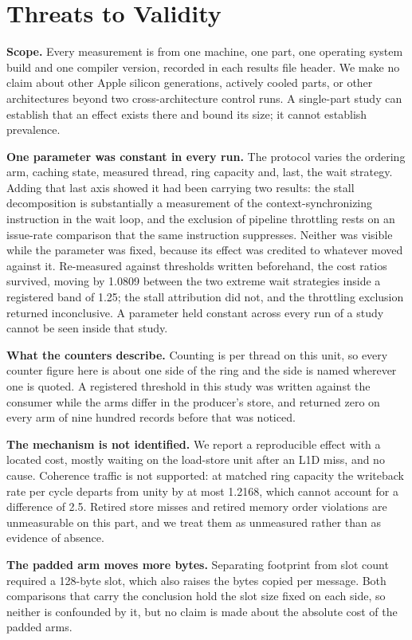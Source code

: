 \documentclass[conference]{IEEEtran}
\begin{document}
\section{Threats to Validity}

\textbf{Scope.} Every measurement is from one machine, one part, one operating
system build and one compiler version, recorded in each results file header. We
make no claim about other Apple silicon generations, actively cooled parts, or
other architectures beyond two cross-architecture control runs. A single-part
study can establish that an effect exists there and bound its size; it cannot
establish prevalence.

\textbf{One parameter was constant in every run.} The protocol varies the
ordering arm, caching state, measured thread, ring capacity and, last, the wait
strategy. Adding that last axis showed it had been carrying two results: the
stall decomposition is substantially a measurement of the
context-synchronizing instruction in the wait loop, and the exclusion of
pipeline throttling rests on an issue-rate comparison that the same instruction
suppresses. Neither was visible while the parameter was fixed,
because its effect was credited to whatever moved against it. Re-measured
against thresholds written beforehand, the cost ratios survived, moving by
1.0809 between the two extreme wait strategies inside a registered band of
1.25; the stall attribution did not, and the throttling exclusion returned
inconclusive. A parameter held constant across every run of a study cannot be
seen inside that study.

\textbf{What the counters describe.} Counting is per thread on this unit, so
every counter figure here is about one side of the ring and the side is named
wherever one is quoted. A registered threshold in this study was written
against the consumer while the arms differ in the producer's store, and
returned zero on every arm of nine hundred records before that was noticed.

\textbf{The mechanism is not identified.} We report a reproducible effect with
a located cost, mostly waiting on the load-store unit after an L1D miss, and no
cause. Coherence traffic is not supported: at matched ring capacity the
writeback rate per cycle departs from unity by at most 1.2168, which cannot
account for a difference of 2.5. Retired store misses and retired memory order
violations are unmeasurable on this part, and we treat them as unmeasured
rather than as evidence of absence.

\textbf{The padded arm moves more bytes.} Separating footprint from slot count
required a 128-byte slot, which also raises the bytes copied per message. Both
comparisons that carry the conclusion hold the slot size fixed on each side, so
neither is confounded by it, but no claim is made about the absolute cost of
the padded arms.
\end{document}
